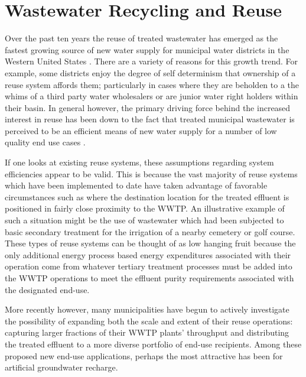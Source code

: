 \section{Wastewater Recycling and Reuse}
    
Over the past ten years the reuse of treated wastewater has emerged as the fastest growing source of new water supply for municipal water districts in the Western United States \cite{Dolnicar2006a,USEPA2012}. There are a variety of reasons for this growth trend. For example, some districts enjoy the degree of self determinism that ownership of a reuse system affords them; particularly in cases where they are beholden to a the whims of a third party water wholesalers or are junior water right holders within their basin. In general however, the primary driving force behind the increased interest in reuse has been down to the fact that treated municipal wastewater is perceived to be an efficient means of new water supply for a number of low quality end use cases \cite{Kennedy2005,CDWR2003}.

If one looks at existing reuse systems, these assumptions regarding system efficiencies appear to be valid. This is because the vast majority of reuse systems which have been implemented to date have taken advantage of favorable circumstances such as where the destination location for the treated effluent is positioned in fairly close proximity to the WWTP. An illustrative example of such a situation might be the use of wastewater which had been subjected to basic secondary treatment for the irrigation of a nearby cemetery or golf course. These types of reuse systems can be thought of as low hanging fruit because the only additional energy process based energy expenditures associated with their operation come from whatever tertiary treatment processes must be added into the WWTP operations to meet the effluent purity requirements associated with the designated end-use. 

More recently however, many municipalities have begun to actively investigate the possibility of expanding both the scale and extent of their reuse operations: capturing larger fractions of their WWTP plants' throughput and distributing the treated effluent to a more diverse portfolio of end-use recipients. Among these proposed new end-use applications, perhaps the most attractive has been for artificial groundwater recharge. 

